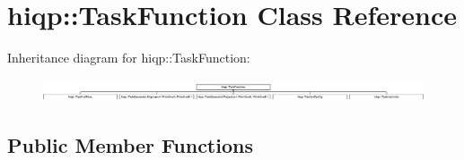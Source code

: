 \hypertarget{classhiqp_1_1TaskFunction}{\section{hiqp\-:\-:Task\-Function Class Reference}
\label{classhiqp_1_1TaskFunction}
}
Inheritance diagram for hiqp\-:\-:Task\-Function\-:\begin{figure}[H]
\begin{center}
\leavevmode
\includegraphics[height=0.668657cm]{classhiqp_1_1TaskFunction}
\end{center}
\end{figure}
\subsection*{Public Member Functions}
